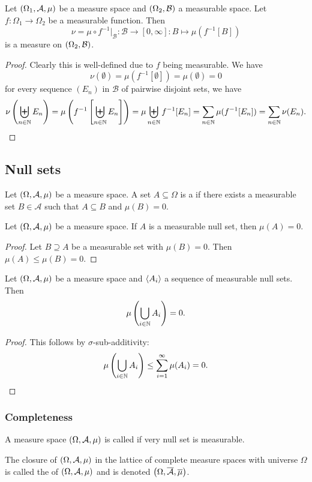 \begin{proposition} \label{pushforwardMeasure}
Let $\left( \Omega_1, \mathcal{A}, \mu \right)$ be a measure space and $\left( \Omega_2, \mathcal{B} \right)$ a measurable space. Let $f: \Omega_1 \to \Omega_2$ be a measurable function. Then
\[ \nu = \mu\circ f^{-1}|_{\mathcal{B}}: \mathcal{B}\to [0,\infty]: B \mapsto \mu(f^{-1}[B]) \]
is a measure on $\left( \Omega_2, \mathcal{B} \right)$.
\end{proposition}
\begin{proof}
Clearly this is well-defined due to $f$ being measurable. We have
\[ \nu(\emptyset) = \mu(f^{-1}[\emptyset])  = \mu(\emptyset) = 0 \]
for every sequence $(E_n)$ in $\mathcal{B}$ of pairwise disjoint sets, we have
\[ \nu\left(\biguplus_{n\in\mathbb{N}}E_n\right) = \mu\left(f^{-1}\left[\biguplus_{n\in\mathbb{N}}E_n\right]\right) = \mu\biguplus_{n\in\mathbb{N}} f^{-1}[E_n]  = \sum_{n\in\mathbb{N}}\mu(f^{-1}[E_n]) = \sum_{n\in\mathbb{N}}\nu(E_n). \]
\end{proof}

\subsection{Null sets}
\begin{definition}
Let $\left( \Omega, \mathcal{A}, \mu \right)$ be a measure space. A set $A\subseteq \Omega$ is a  if there exists a measurable set $B\in\mathcal{A}$ such that $A\subseteq B$ and $\mu(B) = 0$.
\end{definition}

\begin{lemma}
Let $\left( \Omega, \mathcal{A}, \mu \right)$ be a measure space. If $A$ is a measurable null set, then $\mu(A) = 0$.
\end{lemma}
\begin{proof}
Let $B\supseteq A$ be a measurable set with $\mu(B) = 0$. Then $\mu(A) \leq \mu(B) = 0$.
\end{proof}

\begin{lemma}
Let $\left( \Omega, \mathcal{A}, \mu \right)$ be a measure space and $\left\langle A_i \right\rangle$ a sequence of measurable null sets. Then
\[ \mu\left(\bigcup_{i\in\mathbb{N}}A_i\right) = 0. \]
\end{lemma}
\begin{proof}
This follows by $\sigma$-sub-additivity:
\[ \mu\left(\bigcup_{i\in\mathbb{N}}A_i\right) \leq \sum_{i=1}^\infty \mu(A_i) = 0. \]
\end{proof}

\subsubsection{Completeness}
\begin{definition}
A measure space $\left( \Omega, \mathcal{A}, \mu \right)$ is called  if very null set is
measurable.

The closure of $\left( \Omega, \mathcal{A}, \mu \right)$ in the lattice of complete measure spaces with universe $\Omega$ is called the  of $\left( \Omega, \mathcal{A}, \mu \right)$ and is denoted $\left( \Omega, \overline{\mathcal{A}}, \overline{\mu} \right)$.
\end{definition}



